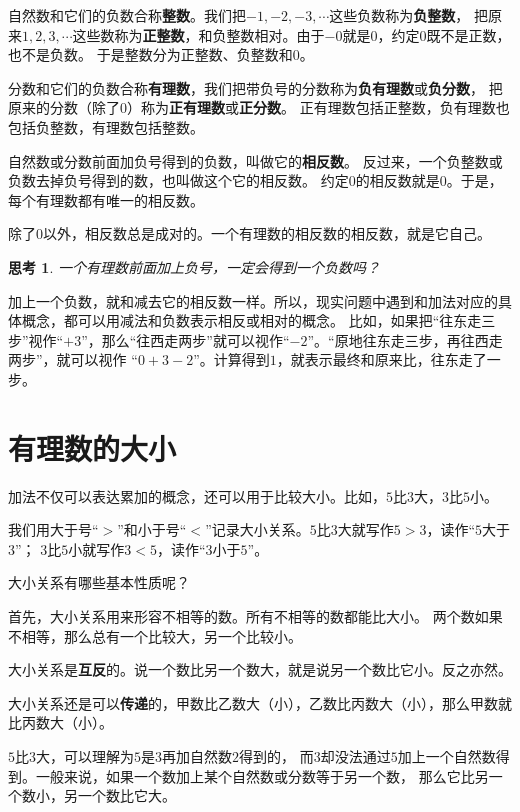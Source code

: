 \documentclass[12pt,UTF8]{ctexbook}
\newtheorem{sk}{思考}[section]
\begin{document}
自然数和它们的负数合称\textbf{整数}。我们把$-1, -2, -3, \cdots$这些负数称为\textbf{负整数}，
把原来$1,2,3,\cdots$这些数称为\textbf{正整数}，和负整数相对。由于$-0$就是$0$，约定$0$既不是正数，也不是负数。
于是整数分为正整数、负整数和$0$。

分数和它们的负数合称\textbf{有理数}，我们把带负号的分数称为\textbf{负有理数}或\textbf{负分数}，
把原来的分数（除了$0$）称为\textbf{正有理数}或\textbf{正分数}。
正有理数包括正整数，负有理数也包括负整数，有理数包括整数。

自然数或分数前面加负号得到的负数，叫做它的\textbf{相反数}。
反过来，一个负整数或负数去掉负号得到的数，也叫做这个它的相反数。
约定$0$的相反数就是$0$。于是，每个有理数都有唯一的相反数。

除了$0$以外，相反数总是成对的。一个有理数的相反数的相反数，就是它自己。

\begin{sk}\label{sk:0-0-0}
    一个有理数前面加上负号，一定会得到一个负数吗？
\end{sk}

加上一个负数，就和减去它的相反数一样。所以，现实问题中遇到和加法对应的具体概念，都可以用减法和负数表示相反或相对的概念。
比如，如果把“往东走三步”视作“$+3$”，那么“往西走两步”就可以视作“$-2$”。“原地往东走三步，再往西走两步”，就可以视作
“$0+3-2$”。计算得到$1$，就表示最终和原来比，往东走了一步。

\section{有理数的大小}
加法不仅可以表达累加的概念，还可以用于比较大小。比如，$5$比$3$大，$3$比$5$小。

我们用大于号“$>$”和小于号“$<$”记录大小关系。$5$比$3$大就写作$5>3$，读作“$5$大于$3$”；
$3$比$5$小就写作$3<5$，读作“$3$小于$5$”。

大小关系有哪些基本性质呢？

首先，大小关系用来形容不相等的数。所有不相等的数都能比大小。
两个数如果不相等，那么总有一个比较大，另一个比较小。

大小关系是\textbf{互反}的。说一个数比另一个数大，就是说另一个数比它小。反之亦然。

大小关系还是可以\textbf{传递}的，甲数比乙数大（小），乙数比丙数大（小），那么甲数就比丙数大（小）。

$5$比$3$大，可以理解为$5$是$3$再加自然数$2$得到的，
而$3$却没法通过$5$加上一个自然数得到。一般来说，如果一个数加上某个自然数或分数等于另一个数，
那么它比另一个数小，另一个数比它大。
\end{document}
